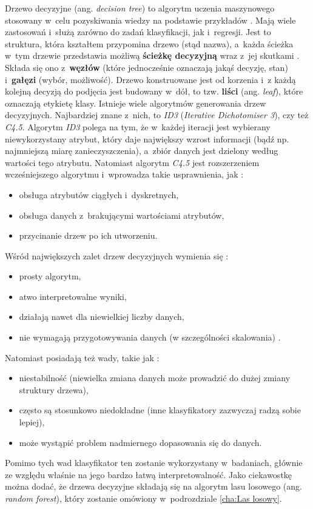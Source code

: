 Drzewo decyzyjne (ang. \textit{decision tree}) to algorytm uczenia maszynowego stosowany w~celu pozyskiwania wiedzy na podstawie przykładów \cite{wiki:dec.drzewo}. Mają wiele zastosowań i~służą zarówno do zadań klasyfikacji, jak i~regresji. Jest to struktura, która kształtem przypomina drzewo (stąd nazwa), a~każda ścieżka w~tym drzewie przedstawia możliwą \textbf{ścieżkę decyzyjną} wraz z~jej skutkami \cite{Grus18}. Składa się ono z~\textbf{węzłów} (które jednocześnie oznaczają jakąś decyzję, stan) i~\textbf{gałęzi} (wybór, możliwość). Drzewo konstruowane jest od korzenia i~z każdą kolejną decyzją do podjęcia jest budowany w~dół, to tzw. \textbf{liści} (ang. \textit{leaf}), które oznaczają etykietę klasy. Istnieje wiele algorytmów generowania drzew decyzyjnych. Najbardziej znane z~nich, to \textit{ID3} (\textit{Iterative Dichotomiser 3}), czy też \textit{C4.5}. Algorytm \textit{ID3} polega na tym, że w~każdej iteracji jest wybierany niewykorzystany atrybut, który daje największy wzrost informacji (bądź np. najmniejszą miarę zanieczyszczenia), a~zbiór danych jest dzielony według wartości tego atrybutu. Natomiast algorytm \textit{C4.5} jest rozszerzeniem wcześniejszego algorytmu i~wprowadza takie usprawnienia, jak \cite{Quinlan96}:
\begin{itemize}
\item
obsługa atrybutów ciągłych i~dyskretnych,

\item
obsługa danych z~brakującymi wartościami atrybutów,

\item
przycinanie drzew po ich utworzeniu.
\end{itemize}
\noindent Wśród największych zalet drzew decyzyjnych wymienia się \cite{wiki:dec.tree}:
\begin{itemize}
\item
prosty algorytm,

\item
atwo interpretowalne wyniki,

\item
działają nawet dla niewielkiej liczby danych,

\item
nie wymagają przygotowywania danych (w szczególności skalowania) \cite{Sawka18}.
\end{itemize}
\noindent Natomiast posiadają też wady, takie jak \cite{wiki:dec.tree}:
\begin{itemize}
\item
niestabilność (niewielka zmiana danych może prowadzić do dużej zmiany struktury drzewa),

\item
często są stosunkowo niedokładne (inne klasyfikatory zazwyczaj radzą sobie lepiej),

\item
może wystąpić problem nadmiernego dopasowania się do danych.
\end{itemize}
\noindent Pomimo tych wad klasyfikator ten zostanie wykorzystany w~badaniach, głównie ze względu właśnie na jego bardzo łatwą interpretowalność.
Jako ciekawostkę można dodać, że drzewa decyzyjne składają się na algorytm lasu losowego (ang. \textit{random forest}), który zostanie omówiony w~podrozdziale \ref{cha:Las losowy}. 

